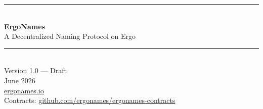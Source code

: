 \documentclass[11pt]{article}
\newcommand{\name}[1]{\texttt{\textasciitilde#1}}
\newcommand{\code}[1]{\texttt{#1}}
\begin{document}
\begin{titlepage}
  \centering
  \vspace*{2.5cm}
  {\color{ergoorange}\rule{\textwidth}{2pt}}\\[1.2cm]
  {\Huge\bfseries ErgoNames}\\[0.6cm]
  {\LARGE A Decentralized Naming Protocol on Ergo}\\[1.2cm]
  {\color{ergoorange}\rule{\textwidth}{2pt}}\\[2cm]
  {\large Version 1.0 --- Draft}\\[0.4cm]
  {\large June 2026}\\
  \vfill
  {\large \href{https://ergonames.io}{ergonames.io}}\\[0.3cm]
  {\small Contracts: \href{https://github.com/ergonames/ergonames-contracts}{github.com/ergonames/ergonames-contracts}}
\end{titlepage}

\begin{abstract}
\noindent
ErgoNames is a decentralized naming protocol built natively on the Ergo
blockchain. It maps human-readable names (e.g.\ \name{adoo}) to Ergo
addresses and arbitrary on-chain identities, with each name issued as a
non-fungible token (NFT) under a \emph{lifetime-ownership} model: a name is
bought once, owned forever, and freely transferable --- there are no renewal
fees and no expiry.

The protocol is implemented entirely in ErgoScript on Ergo's extended-UTXO
(eUTXO) model. A single on-chain registry box, carrying an authenticated AVL
tree, guarantees global name uniqueness without any trusted intermediary.
Registration uses a commit--reveal scheme to prevent front-running, prices
names in USD via a decentralized ERG/USD oracle, and embeds the name's
artwork directly on-chain as an SVG --- no external hosting, IPFS, or mutable
metadata. Every name additionally anchors its own subname registry, enabling
hierarchical names (\code{sub\textasciitilde name}) controlled by the parent
name's holder.

This paper describes the protocol's design goals, contract architecture,
registration flow, pricing mechanism, refund and fund-safety guarantees, and
upgrade path.
\end{abstract}

\vspace{0.5cm}
\tableofcontents
\newpage

\end{document}
